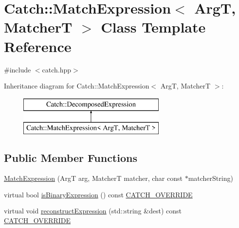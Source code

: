 \hypertarget{classCatch_1_1MatchExpression}{\section{Catch\-:\-:Match\-Expression$<$ Arg\-T, Matcher\-T $>$ Class Template Reference}
\label{classCatch_1_1MatchExpression}
}


{\ttfamily \#include $<$catch.\-hpp$>$}

Inheritance diagram for Catch\-:\-:Match\-Expression$<$ Arg\-T, Matcher\-T $>$\-:\begin{figure}[H]
\begin{center}
\leavevmode
\includegraphics[height=2.000000cm]{classCatch_1_1MatchExpression}
\end{center}
\end{figure}
\subsection*{Public Member Functions}
\begin{DoxyCompactItemize}
\item 
\hyperlink{classCatch_1_1MatchExpression_a506f25bad7970cb35f9dbe54763a8ca5}{Match\-Expression} (Arg\-T arg, Matcher\-T matcher, char const $\ast$matcher\-String)
\item 
virtual bool \hyperlink{classCatch_1_1MatchExpression_ac4edf6e9a6e5762a487db1486d0d1f45}{is\-Binary\-Expression} () const \hyperlink{catch_8hpp_a8ecdce4d3f57835f707915ae831eb847}{C\-A\-T\-C\-H\-\_\-\-O\-V\-E\-R\-R\-I\-D\-E}
\item 
virtual void \hyperlink{classCatch_1_1MatchExpression_a4410a93bc5b8241eb2502f400fce7ec4}{reconstruct\-Expression} (std\-::string \&dest) const \hyperlink{catch_8hpp_a8ecdce4d3f57835f707915ae831eb847}{C\-A\-T\-C\-H\-\_\-\-O\-V\-E\-R\-R\-I\-D\-E}
\end{DoxyCompactItemize}


